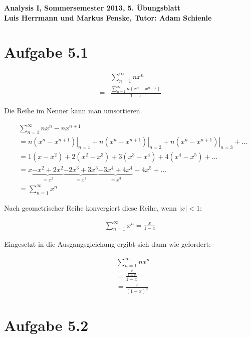 \documentclass[a4paper,german,12pt,smallheadings]{scrartcl}
\begin{document}
\begin{center}
\bfseries %
\sffamily %
\vspace{-40pt}
Analysis I, Sommersemester 2013, 5. Übungsblatt \\
Luis Herrmann und Markus Fenske, Tutor: Adam Schienle
\vspace{-10pt}
\end{center}

\section{Aufgabe 5.1}

\begin{align*}
   &\sum_{n=1}^\infty nx^n \\
  =&\frac{\sum_{n=1}^\infty n(x^n - x^{n+1})}{1-x}
\end{align*}

Die Reihe im Nenner kann man umsortieren.

\begin{align*}
  &\sum_{n=1}^\infty nx^n - nx^{n+1} \\
  &= \left. n(x^n - x^{n+1}) \right|_{n=1} + \left. n(x^n - x^{n+1}) \right|_{n=2} + \left. n(x^n - x^{n+1}) \right|_{n=3} + \dots \\
  &= 1(x - x^2) + 2(x^2 - x^3) + 3(x^3 - x^4) + 4(x^4 - x^5) + \dots \\
  &= x \underbrace{- x^2 + 2x^2}_{=x^2} \underbrace{- 2x^3 + 3x^3}_{=x^3} \underbrace{- 3x^4 + 4x^4}_{=x^3} - 4x^5 + \dots \\
  &= \sum_{n=1}^\infty x^n
\end{align*}

Nach geometrischer Reihe konvergiert diese Reihe, wenn $|x| < 1$:

\begin{align*}
  \sum_{n=1}^\infty x^n = \frac{x}{1-x}
\end{align*}

Eingesetzt in die Ausgangsgleichung ergibt sich dann wie gefordert:

\begin{align*}
   &\sum_{n=1}^\infty nx^n \\
  &=\frac{\frac{x}{1-x}}{1-x} \\
  &=\frac{x}{(1-x)^2}
\end{align*}

\section{Aufgabe 5.2}
\end{document}
